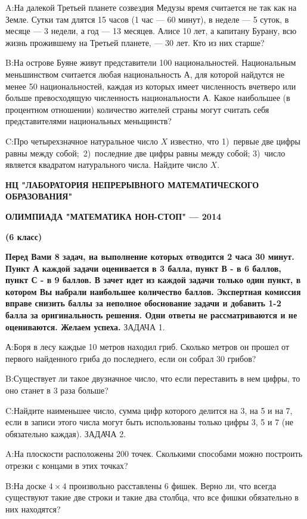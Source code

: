 \documentclass[10pt]{scrbook} \usepackage{modules/nonstahp_book}
\begin{document}
A:\qquad На далекой Третьей планете созвездия Медузы время  считается не так как на Земле. Сутки там длятся 15 часов (1 час — 60 минут), в неделе — 5 суток, в месяце — 3 недели, а год — 13 месяцев. Алисе 10 лет, а капитану  Бурану, всю жизнь прожившему  на Третьей планете, — 30 лет. Кто из них старше? 

B:\qquad На острове Буяне живут представители 100 национальностей. Национальным меньшинством считается любая национальность  А, для которой найдутся не менее 50 национальностей, каждая из которых имеет численность вчетверо или больше превосходящую численность национальности А. Какое наибольшее (в процентном отношении) количество жителей страны могут считать себя представителями национальных меньщинств?

C:\qquad Про четырехзначное натуральное число $X$ известно, что 1)\ первые две цифры равны между собой;\ 2)\ последние две цифры равны между собой; 3)\ число является квадратом натурального числа. Найдите число $X.$
\vfill\eject
\centerline{\bf НЦ "ЛАБОРАТОРИЯ НЕПРЕРЫВНОГО МАТЕМАТИЧЕСКОГО ОБРАЗОВАНИЯ"}
\centerline{\bf ОЛИМПИАДА "МАТЕМАТИКА НОН-СТОП" — 2014}
\bigbreak
\centerline{\bf  (6 класс)}
\medbreak
\noindent
{\bf Перед Вами  8  задач, на выполнение которых отводится  2 часа 30 минут. Пункт А каждой задачи оценивается в 3 балла, пункт В - в 6 баллов, пункт С - в  9 баллов. В зачет идет из каждой задачи только один пункт, в котором Вы набрали наибольшее количество баллов. Экспертная комиссия вправе снизить баллы за неполное обоснование задачи и добавить 1-2 балла за оригинальность решения. Одни ответы не рассматриваются и не оцениваются. Желаем успеха.}
\medbreak
\noindent
ЗАДАЧА 1. 

А:\qquad Боря в лесу каждые 10 метров находил гриб. Сколько метров он прошел от первого найденного гриба до последнего, если он собрал 30 грибов?

B:\qquad Существует ли такое двузначное число, что если переставить в нем цифры, то оно станет в 3 раза больше?

C:\qquad Найдите наименьшее число, сумма цифр которого делится на 3, на 5 и на 7, если в записи этого числа могут быть использованы только цифры 3, 5 и 7 (не обязательно каждая).
\medbreak
\noindent
ЗАДАЧА 2.

A:\qquad На плоскости расположены 200 точек. Сколькими способами можно построить отрезки с концами в этих точках?

B:\qquad На доске $4\times 4$ произвольно расставлены 6 фишек. Верно ли, что всегда существуют такие две строки и такие два столбца, что все фишки обязательно в них находятся?
\end{document}
